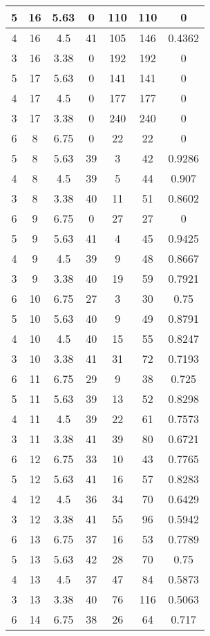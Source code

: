 \documentclass[letterpaper, 12pt]{article}
\begin{document}
\begin{longtable}{|c|c|c|c|c|c|c|}
\hline
5 & 16 & 5.63 & 0 & 110 & 110 & 0 \\
\hline
4 & 16 & 4.5 & 41 & 105 & 146 & 0.4362 \\
\hline
3 & 16 & 3.38 & 0 & 192 & 192 & 0 \\
\hline
5 & 17 & 5.63 & 0 & 141 & 141 & 0 \\
\hline
4 & 17 & 4.5 & 0 & 177 & 177 & 0 \\
\hline
3 & 17 & 3.38 & 0 & 240 & 240 & 0 \\
\hline
6 & 8 & 6.75 & 0 & 22 & 22 & 0 \\
\hline
5 & 8 & 5.63 & 39 & 3 & 42 & 0.9286 \\
\hline
4 & 8 & 4.5 & 39 & 5 & 44 & 0.907 \\
\hline
3 & 8 & 3.38 & 40 & 11 & 51 & 0.8602 \\
\hline
6 & 9 & 6.75 & 0 & 27 & 27 & 0 \\
\hline
5 & 9 & 5.63 & 41 & 4 & 45 & 0.9425 \\
\hline
4 & 9 & 4.5 & 39 & 9 & 48 & 0.8667 \\
\hline
3 & 9 & 3.38 & 40 & 19 & 59 & 0.7921 \\
\hline
6 & 10 & 6.75 & 27 & 3 & 30 & 0.75 \\
\hline
5 & 10 & 5.63 & 40 & 9 & 49 & 0.8791 \\
\hline
4 & 10 & 4.5 & 40 & 15 & 55 & 0.8247 \\
\hline
3 & 10 & 3.38 & 41 & 31 & 72 & 0.7193 \\
\hline
6 & 11 & 6.75 & 29 & 9 & 38 & 0.725 \\
\hline
5 & 11 & 5.63 & 39 & 13 & 52 & 0.8298 \\
\hline
4 & 11 & 4.5 & 39 & 22 & 61 & 0.7573 \\
\hline
3 & 11 & 3.38 & 41 & 39 & 80 & 0.6721 \\
\hline
6 & 12 & 6.75 & 33 & 10 & 43 & 0.7765 \\
\hline
5 & 12 & 5.63 & 41 & 16 & 57 & 0.8283 \\
\hline
4 & 12 & 4.5 & 36 & 34 & 70 & 0.6429 \\
\hline
3 & 12 & 3.38 & 41 & 55 & 96 & 0.5942 \\
\hline
6 & 13 & 6.75 & 37 & 16 & 53 & 0.7789 \\
\hline
5 & 13 & 5.63 & 42 & 28 & 70 & 0.75 \\
\hline
4 & 13 & 4.5 & 37 & 47 & 84 & 0.5873 \\
\hline
3 & 13 & 3.38 & 40 & 76 & 116 & 0.5063 \\
\hline
6 & 14 & 6.75 & 38 & 26 & 64 & 0.717 \\

\end{longtable}
\end{document}
